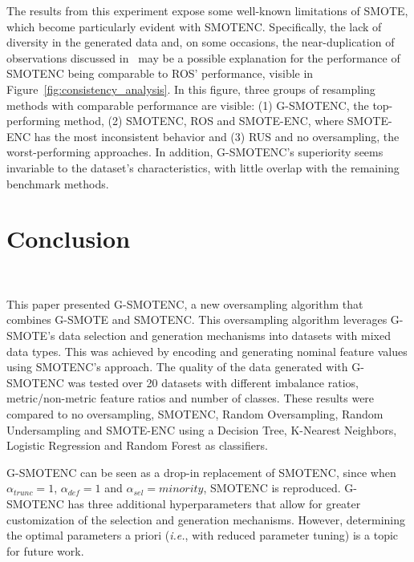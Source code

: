 \documentclass[preprint,12pt]{elsarticle}
\begin{document}
{The results from this experiment expose some well-known limitations of SMOTE,
which become particularly evident with SMOTENC. Specifically, the lack of
diversity in the generated data and, on some occasions, the near-duplication
of observations discussed in~\cite{douzas2019geometric} may be a possible
explanation for the performance of SMOTENC being comparable to ROS'
performance, visible in Figure~\ref{fig:consistency_analysis}. In this
figure, three groups of resampling methods with comparable performance are
visible: (1) G-SMOTENC, the top-performing method, (2) SMOTENC, ROS and
SMOTE-ENC, where SMOTE-ENC has the most inconsistent behavior and (3) RUS and
no oversampling, the worst-performing approaches. In addition, G-SMOTENC's
superiority seems invariable to the dataset's characteristics, with little
overlap with the remaining benchmark methods.

\section{Conclusion}~\label{sec:conclusion}

This paper presented G-SMOTENC, a new oversampling algorithm that combines
G-SMOTE and SMOTENC. This oversampling algorithm leverages G-SMOTE's data
selection and generation mechanisms into datasets with mixed data types. This
was achieved by encoding and generating nominal feature values using SMOTENC's
approach. The quality of the data generated with G-SMOTENC was tested over 20
datasets with different imbalance ratios, metric/non-metric feature ratios
and number of classes. These results were compared to no oversampling,
SMOTENC, Random Oversampling, Random Undersampling and SMOTE-ENC using a
Decision Tree, K-Nearest Neighbors, Logistic Regression and Random Forest as
classifiers.

G-SMOTENC can be seen as a drop-in replacement of SMOTENC, since when
$\alpha_{trunc}=1$, $\alpha_{def}=1$ and $\alpha_{sel}=minority$, SMOTENC is
reproduced. G-SMOTENC has three additional hyperparameters that allow for
greater customization of the selection and generation mechanisms.  However,
determining the optimal parameters a priori (\textit{i.e.}, with reduced
parameter tuning) is a topic for future work.

}
\end{document}
